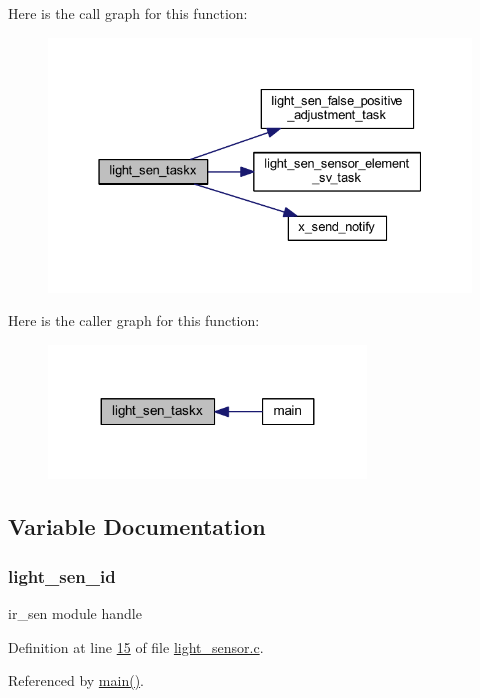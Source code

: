 Here is the call graph for this function\+:\nopagebreak
\begin{figure}[H]
\begin{center}
\leavevmode
\includegraphics[width=331pt]{d1/d2b/a00018_ae9aa2f8b8e90a92755efbcd161c67bc0_cgraph}
\end{center}
\end{figure}




Here is the caller graph for this function\+:\nopagebreak
\begin{figure}[H]
\begin{center}
\leavevmode
\includegraphics[width=239pt]{d1/d2b/a00018_ae9aa2f8b8e90a92755efbcd161c67bc0_icgraph}
\end{center}
\end{figure}




\subsection{Variable Documentation}
\hypertarget{a00018_a757e7771170ace1d9f8519bd318ec64a}{
\subsubsection[{light\+\_\+sen\+\_\+id}]{ light\+\_\+sen\+\_\+id}}\label{a00018_a757e7771170ace1d9f8519bd318ec64a}


ir\+\_\+sen module handle 



Definition at line \hyperlink{a00047_source_l00015}{15} of file \hyperlink{a00047_source}{light\+\_\+sensor.\+c}.



Referenced by \hyperlink{a00048_source_l00080}{main()}.

